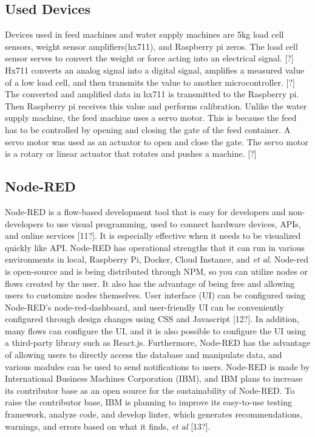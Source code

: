 \documentclass[conference]{IEEEtran}
\begin{document}
 \subsection{Used Devices}
Devices used in feed machines and water supply machines are 5kg load cell sensors, weight sensor amplifiers(hx711), and Raspberry pi zeros.
The load cell sensor serves to convert the weight or force acting into an electrical signal. [?] 
Hx711 converts an analog signal into a digital signal, amplifies a measured value of a low load cell, and then transmits the value to another microcontroller. [?]
The converted and amplified data in hx711 is transmitted to the Raspberry pi. Then Raspberry pi receives this value and performs calibration.
\hfill \break
\indent Unlike the water supply machine, the feed machine uses a servo motor. This is because the feed has to be controlled by opening and closing the gate of the feed container. A servo motor was used as an actuator to open and close the gate. The servo motor is a rotary or linear actuator that rotates and pushes a machine. [?]

\subsection{Node-RED}
 
 Node-RED is a flow-based development tool that is easy for developers and non-developers to use visual programming, used to connect hardware devices, APIs, and online services [11?]. It is especially effective when it needs to be visualized quickly like API. Node-RED has operational strengths that it can run in various environments in local, Raspberry Pi, Docker, Cloud Instance, and \textit{et al}. Node-red is open-source and is being distributed through NPM, so you can utilize nodes or flows created by the user. It also has the advantage of being free and allowing users to customize nodes themselves. User interface (UI) can be configured using Node-RED's node-red-dashboard, and user-friendly UI can be conveniently configured through design changes using CSS and Javascript [12?]. In addition, many flows can configure the UI, and it is also possible to configure the UI using a third-party library such as React.js. Furthermore, Node-RED has the advantage of allowing users to directly access the database and manipulate data, and various modules can be used to send notifications to users. Node-RED is made by International Business Machines Corporation (IBM), and IBM plans to increase its contributor base as an open source for the sustainability of Node-RED. To raise the contributor base, IBM is planning to improve its easy-to-use testing framework, analyze code, and develop linter, which generates recommendations, warnings, and errors based on what it finds, \textit{et al} [13?].
\end{document}

